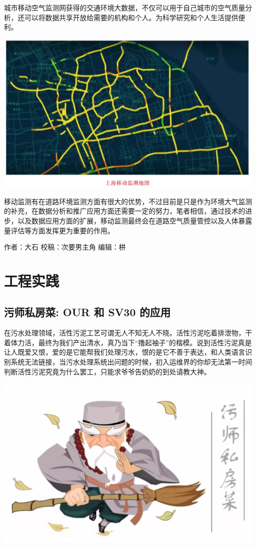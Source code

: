 \documentclass[]{book}
\begin{document}
城市移动空气监测网获得的交通环境大数据，不仅可以用于自己城市的空气质量分析，还可以将数据共享开放给需要的机构和个人。为科学研究和个人生活提供便利。

\includegraphics[width=6.67in]{images/dlyd5}

移动监测有在道路环境监测方面有很大的优势，不过目前是只是作为环境大气监测的补充，在数据分析和推广应用方面还需要一定的努力，笔者相信，通过技术的进步，以及数据应用方面的扩展，移动监测最终会在道路空气质量管控以及人体暴露量评估等方面发挥更为重要的作用。

作者：大石 校稿：次要男主角 编辑：栟

\chapter{工程实践}

\section{污师私房菜: OUR 和 SV30 的应用}\label{-our--sv30-}

在污水处理领域，活性污泥工艺可谓无人不知无人不晓。活性污泥吃着排泄物，干着体力活，最终为我们产出清水，真乃当下``撸起袖子''的楷模。说到活性污泥真是让人既爱又恨，爱的是它能帮我们处理污水，恨的是它不善于表达，和人类语言识别系统无法链接，当污水处理系统出问题的时候，初入运维界的你却无法第一时间判断活性污泥究竟为什么罢工，只能求爷爷告奶奶的到处请教大神。

\includegraphics[width=6.67in]{images/os1}
\end{document}
